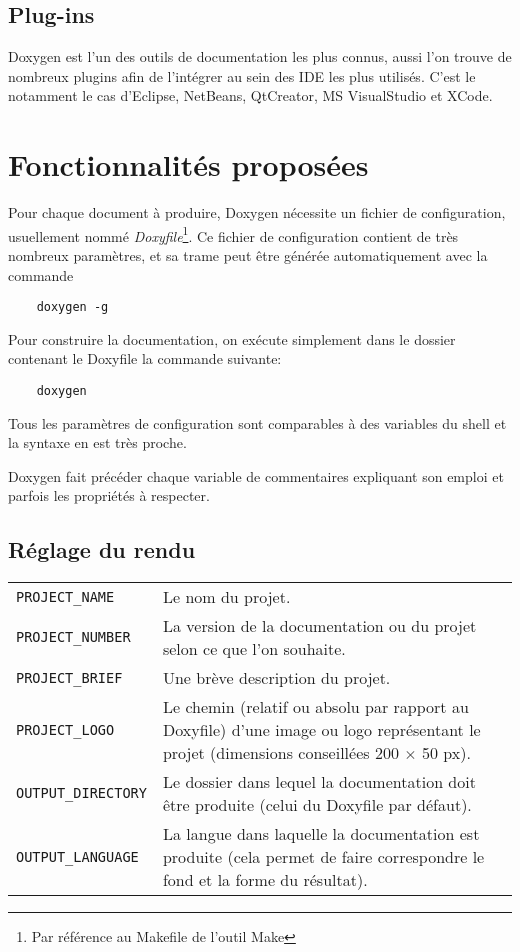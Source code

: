 \subsection{Plug-ins}
  Doxygen est l'un des outils de documentation les plus connus, aussi l'on trouve de nombreux plugins afin de l'intégrer au sein des IDE les plus utilisés. C'est le notamment le cas d'Eclipse, NetBeans, QtCreator, MS VisualStudio et XCode.

\section{Fonctionnalités proposées}
  Pour chaque document à produire, Doxygen nécessite un fichier de configuration, usuellement nommé \emph{Doxyfile}\footnote{Par référence au Makefile de l'outil Make}. Ce fichier de configuration contient de très nombreux paramètres, et sa trame peut être générée automatiquement avec la commande 
  \begin{verbatim}
    doxygen -g
  \end{verbatim}

  Pour construire la documentation, on exécute simplement dans le dossier contenant le Doxyfile la commande suivante:
  \begin{verbatim}
    doxygen
  \end{verbatim}

  Tous les paramètres de configuration sont comparables à des variables du shell et la syntaxe en est très proche.

  Doxygen fait précéder chaque variable de commentaires expliquant son emploi et parfois les propriétés à respecter.
  
  \subsection{Réglage du rendu}
    \noindent
    \begin{tabular}{p{.25\linewidth}p{.7\linewidth}}
      \texttt{PROJECT\_NAME} & Le nom du projet. \\
      \texttt{PROJECT\_NUMBER} & La version de la documentation ou du projet selon ce que l'on souhaite. \\
      \texttt{PROJECT\_BRIEF} & Une brève description du projet. \\
      \texttt{PROJECT\_LOGO} & Le chemin (relatif ou absolu par rapport au Doxyfile) d'une image ou logo représentant le projet (dimensions conseillées 200 $\times$ 50 px). \\
      \texttt{OUTPUT\_DIRECTORY} & Le dossier dans lequel la documentation doit être produite (celui du Doxyfile par défaut). \\
      \texttt{OUTPUT\_LANGUAGE} & La langue dans laquelle la documentation est produite (cela permet de faire correspondre le fond et la forme du résultat).
    \end{tabular}

